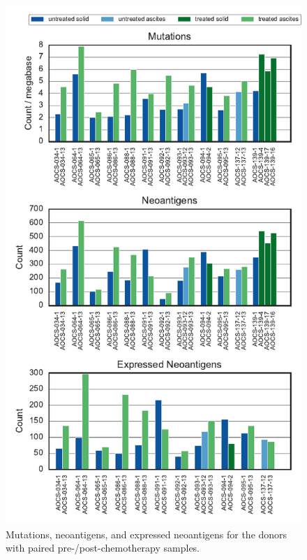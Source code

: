 \begin{figure}
\centering
\includegraphics[scale=1.0]{figures/paired_counts.pdf}
\caption{Mutations, neoantigens, and expressed neoantigens for the donors with paired pre-/post-chemotherapy samples.}
\label{fig:supp_paired}
\end{figure}

